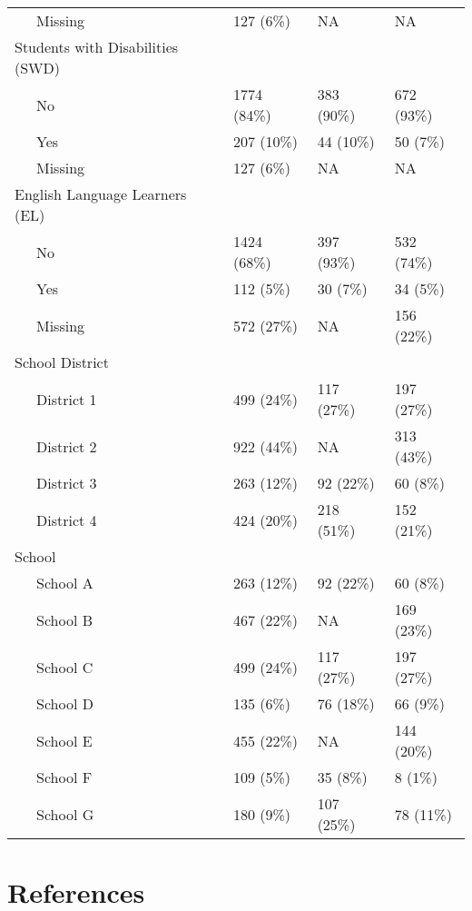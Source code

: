 \documentclass[
  english,
  man, fleqn, noextraspace]{apa6}
\begin{document}
\begin{center}
\begin{ThreePartTable}
\begin{longtable}{llll}
\ \ \ Missing & 127 (6\%) & NA & NA\\
Students with Disabilities (SWD) &  &  & \\
\ \ \ No & 1774 (84\%) & 383 (90\%) & 672 (93\%)\\
\ \ \ Yes & 207 (10\%) & 44 (10\%) & 50 (7\%)\\
\ \ \ Missing & 127 (6\%) & NA & NA\\
English Language Learners (EL) &  &  & \\
\ \ \ No & 1424 (68\%) & 397 (93\%) & 532 (74\%)\\
\ \ \ Yes & 112 (5\%) & 30 (7\%) & 34 (5\%)\\
\ \ \ Missing & 572 (27\%) & NA & 156 (22\%)\\
School District &  &  & \\
\ \ \ District 1 & 499 (24\%) & 117 (27\%) & 197 (27\%)\\
\ \ \ District 2 & 922 (44\%) & NA & 313 (43\%)\\
\ \ \ District 3 & 263 (12\%) & 92 (22\%) & 60 (8\%)\\
\ \ \ District 4 & 424 (20\%) & 218 (51\%) & 152 (21\%)\\
School &  &  & \\
\ \ \ School A & 263 (12\%) & 92 (22\%) & 60 (8\%)\\
\ \ \ School B & 467 (22\%) & NA & 169 (23\%)\\
\ \ \ School C & 499 (24\%) & 117 (27\%) & 197 (27\%)\\
\ \ \ School D & 135 (6\%) & 76 (18\%) & 66 (9\%)\\
\ \ \ School E & 455 (22\%) & NA & 144 (20\%)\\
\ \ \ School F & 109 (5\%) & 35 (8\%) & 8 (1\%)\\
\ \ \ School G & 180 (9\%) & 107 (25\%) & 78 (11\%)\\
\bottomrule
\end{longtable}

\end{ThreePartTable}
\end{center}

\newpage

\hypertarget{references}{%
\section{References}\label{references}}

\begingroup
\setlength{\parindent}{-0.5in}
\setlength{\leftskip}{0.5in}

\hypertarget{refs}{}

\endgroup
\end{document}
